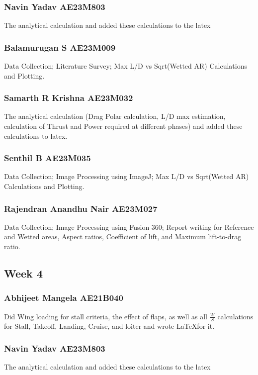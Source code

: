\documentclass[12 pt]{article}
\begin{document}
{{\subsubsection{Navin Yadav AE23M803}
The analytical calculation and added these calculations to the latex 

\subsubsection{Balamurugan S AE23M009}
Data Collection; Literature Survey; Max L/D vs Sqrt(Wetted AR) Calculations and Plotting.


\subsubsection{Samarth R Krishna AE23M032}
The analytical calculation (Drag Polar calculation, L/D max estimation, calculation of Thrust and Power required at different phases) and added these calculations to latex.


\subsubsection{Senthil B AE23M035}
Data Collection; Image Processing using ImageJ; Max L/D vs Sqrt(Wetted AR) Calculations and Plotting.


\subsubsection{Rajendran Anandhu Nair AE23M027}
Data Collection; Image Processing using Fusion 360; Report writing for Reference and Wetted areas, Aspect ratios, Coefficient of lift, and Maximum lift-to-drag ratio. 

\subsection{Week 4}


\subsubsection{Abhijeet Mangela AE21B040}
Did Wing loading for stall criteria, the effect of flaps, as well as all $\frac{W}{S}$ calculations for Stall, Takeoff, Landing, Cruise, and loiter and wrote \LaTeX for it.

\subsubsection{Navin Yadav AE23M803}
The analytical calculation and added these calculations to the latex 

}}
\end{document}
